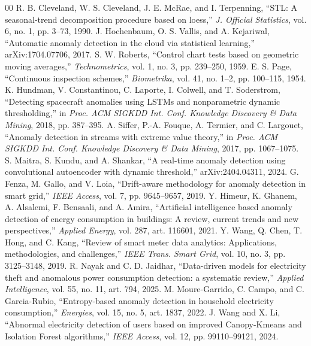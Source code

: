 \documentclass[conference]{IEEEtran}
\begin{document}
\begin{thebibliography}{00}
 R. B. Cleveland, W. S. Cleveland, J. E. McRae, and I. Terpenning, ``STL: A seasonal-trend decomposition procedure based on loess,'' \emph{J. Official Statistics}, vol. 6, no. 1, pp. 3--73, 1990.
 J. Hochenbaum, O. S. Vallis, and A. Kejariwal, ``Automatic anomaly detection in the cloud via statistical learning,'' arXiv:1704.07706, 2017.
 S. W. Roberts, ``Control chart tests based on geometric moving averages,'' \emph{Technometrics}, vol. 1, no. 3, pp. 239--250, 1959.
 E. S. Page, ``Continuous inspection schemes,'' \emph{Biometrika}, vol. 41, no. 1--2, pp. 100--115, 1954.
 K. Hundman, V. Constantinou, C. Laporte, I. Colwell, and T. Soderstrom, ``Detecting spacecraft anomalies using LSTMs and nonparametric dynamic thresholding,'' in \emph{Proc. ACM SIGKDD Int. Conf. Knowledge Discovery \& Data Mining}, 2018, pp. 387--395.
 A. Siffer, P.-A. Fouque, A. Termier, and C. Largouet, ``Anomaly detection in streams with extreme value theory,'' in \emph{Proc. ACM SIGKDD Int. Conf. Knowledge Discovery \& Data Mining}, 2017, pp. 1067--1075.
 S. Maitra, S. Kundu, and A. Shankar, ``A real-time anomaly detection using convolutional autoencoder with dynamic threshold,'' arXiv:2404.04311, 2024.
 G. Fenza, M. Gallo, and V. Loia, ``Drift-aware methodology for anomaly detection in smart grid,'' \emph{IEEE Access}, vol. 7, pp. 9645--9657, 2019.
 Y. Himeur, K. Ghanem, A. Alsalemi, F. Bensaali, and A. Amira, ``Artificial intelligence based anomaly detection of energy consumption in buildings: A review, current trends and new perspectives,'' \emph{Applied Energy}, vol. 287, art. 116601, 2021.
 Y. Wang, Q. Chen, T. Hong, and C. Kang, ``Review of smart meter data analytics: Applications, methodologies, and challenges,'' \emph{IEEE Trans. Smart Grid}, vol. 10, no. 3, pp. 3125--3148, 2019.
 R. Nayak and C. D. Jaidhar, ``Data-driven models for electricity theft and anomalous power consumption detection: a systematic review,'' \emph{Applied Intelligence}, vol. 55, no. 11, art. 794, 2025.
 M. Moure-Garrido, C. Campo, and C. Garcia-Rubio, ``Entropy-based anomaly detection in household electricity consumption,'' \emph{Energies}, vol. 15, no. 5, art. 1837, 2022.
 J. Wang and X. Li, ``Abnormal electricity detection of users based on improved Canopy-Kmeans and Isolation Forest algorithms,'' \emph{IEEE Access}, vol. 12, pp. 99110--99121, 2024.

\end{thebibliography}
\end{document}
